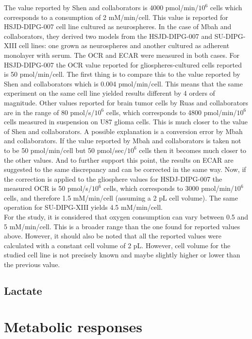 \documentclass[11pt,a4paper]{article}
\begin{document}
The value reported by Shen and collaborators is 4000 pmol/min/$10^6$ cells which corresponds to a consumption of 2 mM/min/cell. This value is reported for HSJD-DIPG-007 cell line cultured as neurospheres.\cite{Shen2019} In the case of Mbah and collaborators, they derived two models from the HSJD-DIPG-007 and SU-DIPG-XIII cell lines: one grown as neurospheres and another cultured as adherent monolayer with serum. The OCR and ECAR were measured in both cases. For HSJD-DIPG-007 the OCR value reported for gliospheres-cultured cells reported is 50 pmol/min/cell. The first thing is to compare this to the value reported by Shen and collaborators which is 0.004 pmol/min/cell. This means that the same experiment on the same cell line yielded results different by 4 orders of magnitude. Other values reported for brain tumor cells by Ruas and collaborators are in the range of 80 pmol/s/$10^6$ cells, which corresponds to 4800 pmol/min/$10^6$ cells measured in suspension on U87 glioma cells. This is much closer to the value of Shen and collaborators. A possible explanation is a conversion error by Mbah and collaborators. If the value reported by Mbah and collaborators is taken not to be 50 pmol/min/cell but 50 pmol/sec/$10^6$ cells then it becomes much closer to the other values. And to further support this point, the results on ECAR are suggested to the same discrepancy and can be corrected in the same way. Now, if the correction is applied to the gliosphere values for HSDJ-DIPG-007 the measured OCR is 50 pmol/s/$10^6$ cells, which corresponds to 3000 pmol/min/$10^6$ cells, and therefore 1.5 mM/min/cell (assuming a 2 pL cell volume). The same operation for SU-DIPG-XIII yields 4.5 mM/min/cell.\\

For the study, it is considered that oxygen consumption can vary between 0.5 and 5 mM/min/cell. This is a broader range than the one found for reported values above. However, it should also be noted that all the reported values were calculated with a constant cell volume of 2 pL. However, cell volume for the studied cell line is not precisely known and maybe slightly higher or lower than the previous value.\\

\subsection{}

\subsection{Lactate}

\section{Metabolic responses} 

\newpage


\end{document}
